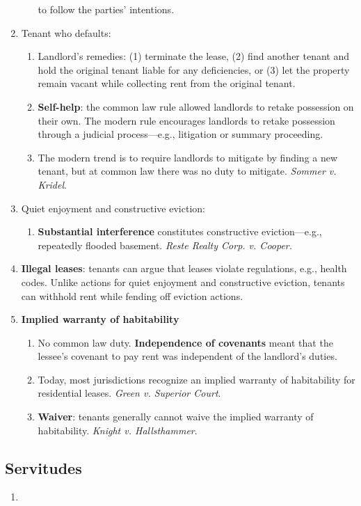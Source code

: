 \begin{enumerate}
\begin{enumerate}
        to follow the parties' intentions.
    \end{enumerate}
    \item Tenant who defaults:
    \begin{enumerate}
        \item Landlord's remedies: (1) terminate the lease, (2) find another 
        tenant and hold the original tenant liable for any deficiencies, or 
        (3) let the property remain vacant while collecting rent from the 
        original tenant.
        \item \textbf{Self-help}: the common law rule allowed landlords to 
        retake possession on their own. The modern rule encourages landlords 
        to retake possession through a judicial process---e.g., litigation or 
        summary proceeding.
        \item The modern trend is to require landlords to mitigate by finding 
        a new tenant, but at common law there was no duty to mitigate. 
        \emph{Sommer v. Kridel}.
    \end{enumerate}
    \item Quiet enjoyment and constructive eviction:
    \begin{enumerate}
        \item \textbf{Substantial interference} constitutes constructive 
        eviction---e.g., repeatedly flooded basement. \emph{Reste Realty Corp. 
        v. Cooper.}
    \end{enumerate}
    \item \textbf{Illegal leases}: tenants can argue that leases violate 
    regulations, e.g., health codes. Unlike actions for quiet enjoyment and 
    constructive eviction, tenants can withhold rent while fending off 
    eviction actions.
    \item \textbf{Implied warranty of habitability}
    \begin{enumerate}
        \item No common law duty. \textbf{Independence of covenants} meant 
        that the lessee's covenant to pay rent was independent of the 
        landlord's duties.
        \item Today, most jurisdictions recognize an implied warranty of 
        habitability for residential leases. \emph{Green v. Superior Court}.
        \item \textbf{Waiver}: tenants generally cannot waive the implied 
        warranty of habitability. \emph{Knight v. Hallsthammer}. %
    \end{enumerate}
\end{enumerate}

\subsection{Servitudes}

\begin{enumerate}
    \item %
\end{enumerate}

